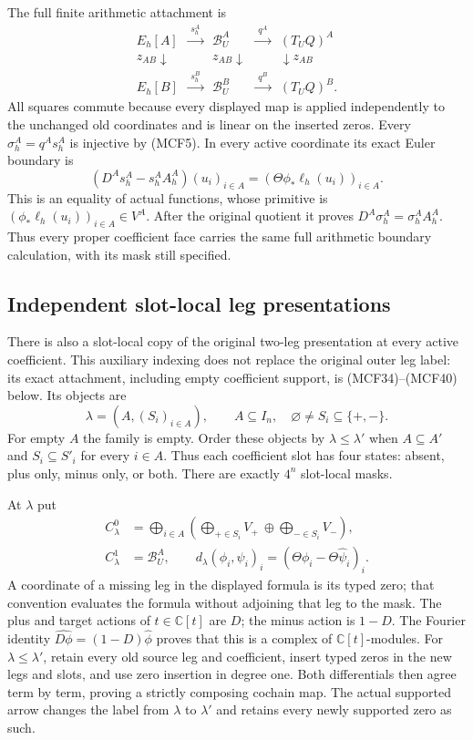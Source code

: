 \documentclass[11pt,a4paper]{article}
\begin{document}
The full finite arithmetic attachment is
\[
\begin{array}{ccccc}
E_h[A]&\xrightarrow{\ s_h^A\ }&\mathscr B_U^A
       &\xrightarrow{\ q^A\ }&(T_UQ)^A\\
z_{AB}\downarrow&&z_{AB}\downarrow&&\downarrow z_{AB}\\
E_h[B]&\xrightarrow{\ s_h^B\ }&\mathscr B_U^B
       &\xrightarrow{\ q^B\ }&(T_UQ)^B.
\end{array}
\tag{MCF9}
\]
All squares commute because every displayed map is applied independently
to the unchanged old coordinates and is linear on the inserted zeros.
Every $\sigma_h^A=q^As_h^A$ is injective by (MCF5).  In every active
coordinate its exact Euler boundary is
\[
(D^As_h^A-s_h^AA_h^A)(u_i)_{i\in A}
 =(\Theta\phi_*\ell_h(u_i))_{i\in A}.
\tag{MCF10}
\]
This is an equality of actual functions, whose primitive is
$(\phi_*\ell_h(u_i))_{i\in A}\in V^A$.
After the original quotient it proves $D^A\sigma_h^A=\sigma_h^AA_h^A$.
Thus every proper coefficient face carries the same full arithmetic
boundary calculation, with its mask still specified.

\subsection{Independent slot-local leg presentations}

There is also a slot-local copy of the original two-leg presentation at
every active coefficient.  This auxiliary indexing does not replace the
original outer leg label: its exact attachment, including empty coefficient
support, is (MCF34)--(MCF40) below.  Its objects are
\[
\lambda=(A,(S_i)_{i\in A}),\qquad
A\subseteq I_n,\quad\varnothing\ne S_i\subseteq\{+,-\}.
\tag{MCF11}
\]
For empty $A$ the family is empty.  Order these objects by
$\lambda\leq\lambda'$ when $A\subseteq A'$ and $S_i\subseteq S'_i$
for every $i\in A$.  Thus each coefficient slot has four states: absent,
plus only, minus only, or both.  There are exactly $4^n$ slot-local masks.

At $\lambda$ put
\[
\begin{split}
C_\lambda^0&=\bigoplus_{i\in A}
   \left(\bigoplus_{+\in S_i}V_+\ \oplus\!
                         \bigoplus_{-\in S_i}V_-\right),\\
C_\lambda^1&=\mathscr B_U^A,\qquad
d_\lambda(\phi_i,\psi_i)_i
       =(\Theta\phi_i-\Theta\widehat\psi_i)_i.
\end{split}
\tag{MCF12}
\]
A coordinate of a missing leg in the displayed formula is its typed zero;
that convention evaluates the formula without adjoining that leg to the
mask.  The plus and target actions of $t\in\mathbb C[t]$ are $D$; the
minus action is $1-D$.  The Fourier identity
$\widehat{D\phi}=(1-D)\widehat\phi$ proves that this is a complex of
$\mathbb C[t]$-modules.  For $\lambda\leq\lambda'$, retain every old
source leg and coefficient, insert typed zeros in the new legs and slots,
and use zero insertion in degree one.  Both differentials then agree
term by term, proving a strictly composing cochain map.  The actual
supported arrow changes the label from $\lambda$ to $\lambda'$ and
retains every newly supported zero as such.
\end{document}
